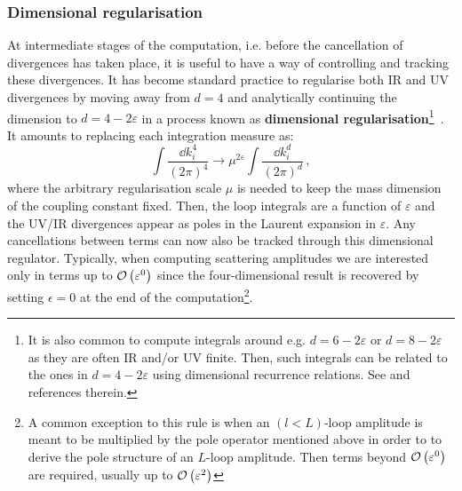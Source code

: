 \documentclass[main.tex]{subfiles}
\begin{document}
\subsubsection{Dimensional regularisation}
At intermediate stages of the computation, i.e. before the cancellation of divergences has taken place, it is useful to have a way of controlling and tracking these divergences. It has become standard practice to regularise both IR and UV divergences by moving away from $d=4$ and analytically continuing the dimension to $d=4-2\varepsilon$ in a process known as \textbf{dimensional regularisation}\footnote{It is also common to compute integrals around e.g. $d=6-2\varepsilon$ or $d=8-2\varepsilon$ as they are often IR and/or UV finite. Then, such integrals can be related to the ones in $d=4-2\varepsilon$ using dimensional recurrence relations. See \cite{Bern:1993kr, Lee:2012cn} and references therein.}~\cite{bollini1964analytic, THOOFT1972189}. It amounts to replacing each integration measure as:
\begin{equation}
    \int \frac{\dd k_i^{4}}{(2\pi)^4} \longrightarrow \mu^{2\varepsilon} \int \frac{\dd k_i^{d}}{(2\pi)^d}\,,
\end{equation}
where the arbitrary regularisation scale $\mu$ is needed to keep the mass dimension of the coupling constant fixed. Then, the loop integrals are a function of $\varepsilon$ and the UV/IR divergences appear as poles in the Laurent expansion in $\varepsilon$. Any cancellations between terms can now also be tracked through this dimensional regulator. Typically, when computing scattering amplitudes we are interested only in terms up to $\mathcal{O}\left(\varepsilon^0\right)$ since the four-dimensional result is recovered by setting $\epsilon = 0$ at the end of the computation\footnote{A common exception to this rule is when an $(l<L)$-loop amplitude is meant to be multiplied by the pole operator mentioned above in order to to derive the pole structure of an $L$-loop amplitude. Then terms beyond $\mathcal{O}\left(\varepsilon^0\right)$ are required, usually up to $\mathcal{O}\left(\varepsilon^2\right)$}.
\end{document}
